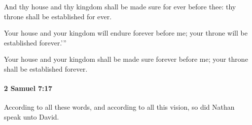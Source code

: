 			\begin{versebox}
					\item[BHS] 
					\item[ASV] And thy house and thy kingdom shall be made sure for ever before thee: thy throne shall be established for ever.
					\item[NIV] Your house and your kingdom will endure forever before me; your throne will be established forever.’”
					\item[NRSV] Your house and your kingdom shall be made sure forever before me; your throne shall be established forever.
			\end{versebox}

		\paragraph{2 Samuel 7:17} %
			\label{2SAMUEL-7-17}

			According to all these words, and according to all this vision, so did Nathan speak unto David.

